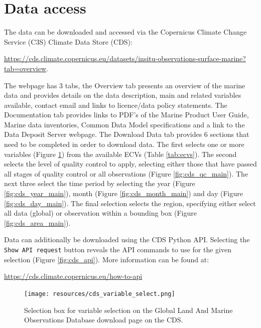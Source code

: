 \section{Data access}\label{sec:data_access}
The data can be downloaded and accessed via the Copernicus Climate Change Service (C3S) Climate Data Store (CDS):
\begin{center}
\sloppy\url{https://cds.climate.copernicus.eu/datasets/insitu-observations-surface-marine?tab=overview}.
 \end{center}
The webpage has 3 tabs, the Overview tab presents an overview of the marine data and provides details on the data description, main and related variables available, contact email and links to licence/data policy statements. 
The Documentation tab provides links to PDF’s of the Marine Product User Guide, Marine data inventories, Common Data Model specifications and a link to the Data Deposit Server webpage. The Download Data tab provides 6 sections that need to be completed in order to download data. The first selects one or more variables (Figure \ref{fig:cds_variable_main}) from the available ECVs (Table \ref{tab:ecvs}). The second selects the level of quality control to apply, selecting either those that have passed all stages of quality control or all observations (Figure \ref{fig:cds_qc_main}). The next three select the time period  by selecting the year (Figure \ref{fig:cds_year_main}), month (Figure \ref{fig:cds_month_main}) and day (Figure \ref{fig:cds_day_main}). The final selection selects the region, specifying either select all data (global) or observation within a bounding box (Figure \ref{fig:cds_area_main}).

Data can additionally be downloaded using the CDS Python API. Selecting the \texttt{Show API request} button reveals the API commands to use for the given selection (Figure \ref{fig:cds_api}). More information can be found at:

\begin{center}
\url{https://cds.climate.copernicus.eu/how-to-api}
\end{center}

\begin{figure}[h]
\begin{center}
\texttt{[image: resources/cds\_variable\_select.png]}
\caption{Selection box for variable selection on the Global Land And Marine Observations Database download page on the CDS.\\}
\label{fig:cds_variable_main}
\end{center}
\end{figure}


